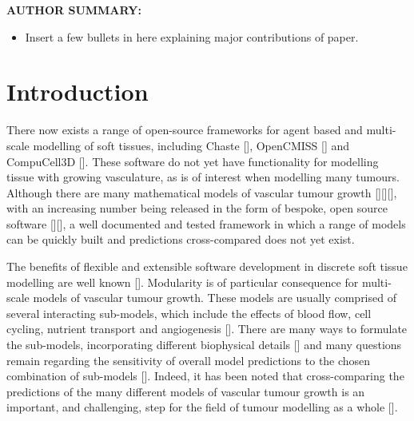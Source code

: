\documentclass[superscriptaddress, a4paper]{article}
\newenvironment{authorsummary}
{\begin{framed} \begin{center} \begin{minipage}{0.9\textwidth} \noindent}
{\end{minipage} \end{center} \end{framed}}
\begin{document}
\begin{authorsummary}

\textbf{AUTHOR SUMMARY:}

\begin{itemize}
 \item Insert a few bullets in here explaining major contributions of paper.
\end{itemize}

\end{authorsummary}

\newpage

\setcounter{tocdepth}{3}
\tableofcontents

\newpage
\doublespacing

\section{Introduction}
\label{sec:introduction}

There now exists a range of open-source frameworks for agent based and multi-scale modelling of soft tissues, including Chaste [], OpenCMISS [] and CompuCell3D []. These software do not yet have functionality for modelling tissue with growing vasculature, as is of interest when modelling many tumours. Although there are many mathematical models of vascular tumour growth [][][], with an increasing number being released in the form of bespoke, open source software [][], a well documented and tested framework in which a range of models can be quickly built and predictions cross-compared does not yet exist.

The benefits of flexible and extensible software development in discrete soft tissue modelling are well known []. Modularity is of particular consequence for multi-scale models of vascular tumour growth. These models are usually comprised of several interacting sub-models, which include the effects of blood flow, cell cycling, nutrient transport and angiogenesis []. There are many ways to formulate the sub-models, incorporating different biophysical details [] and many questions remain regarding the sensitivity of overall model predictions to the chosen combination of sub-models []. Indeed, it has been noted that cross-comparing the predictions of the many different models of vascular tumour growth is an important, and challenging, step for the field of tumour modelling as a whole [].
\end{document}

